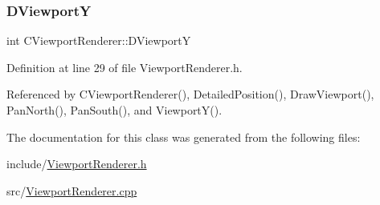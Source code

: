 \subsubsection{\texorpdfstring{D\+ViewportY}{DViewportY}}
{\footnotesize\ttfamily int C\+Viewport\+Renderer\+::\+D\+ViewportY\hspace{0.3cm}{\ttfamily [protected]}}



Definition at line 29 of file Viewport\+Renderer.\+h.



Referenced by C\+Viewport\+Renderer(), Detailed\+Position(), Draw\+Viewport(), Pan\+North(), Pan\+South(), and Viewport\+Y().



The documentation for this class was generated from the following files\+:\begin{DoxyCompactItemize}
\item 
include/\hyperlink{ViewportRenderer_8h}{Viewport\+Renderer.\+h}\item 
src/\hyperlink{ViewportRenderer_8cpp}{Viewport\+Renderer.\+cpp}\end{DoxyCompactItemize}
